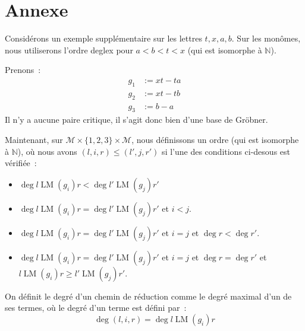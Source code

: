 \documentclass{article}
\newcommand{\N}{\mathbb{N}}
\newcommand{\M}{\mathcal{M}}
\DeclareMathOperator{\LM}{LM}
\begin{document}
\nocite{*}
\printbibliography

\section*{Annexe}

Considérons un exemple supplémentaire sur les lettres $t, x, a, b$.
Sur les monômes, nous utiliserons l'ordre deglex pour $a < b < t < x$ (qui est isomorphe à $\N$).

Prenons~:
\begin{align*}
	g_1 &:= xt - ta \\
	g_2 &:= xt - tb \\
	g_3 &:= b - a
\end{align*}
Il n'y a aucune paire critique, il s'agit donc bien d'une base de Gröbner.

Maintenant, sur $\M\times\{1,2,3\}\times\M$, nous définissons un ordre (qui est isomorphe à $\N$), où nous avons $(l, i, r) \leq (l', j, r')$ si l'une des conditions ci-desous est vérifiée~:
\begin{itemize}
	\item $\deg{l\LM(g_i)r} < \deg{l'\LM(g_j)r'}$
	\item $\deg{l\LM(g_i)r} = \deg{l'\LM(g_j)r'}$ et $i < j$.
	\item $\deg{l\LM(g_i)r} = \deg{l'\LM(g_j)r'}$ et $i = j$ et $\deg{r} < \deg{r'}$.
	\item $\deg{l\LM(g_i)r} = \deg{l'\LM(g_j)r'}$ et $i = j$ et $\deg{r} = \deg{r'}$ et $l\LM(g_i)r \geq l'\LM(g_j)r'$.
\end{itemize}
On définit le degré d'un chemin de réduction comme le degré maximal d'un de ses termes, où le degré d'un terme est défini par~:
$$\deg{(l, i, r)} = \deg{l \LM(g_i) r}$$
\end{document}
